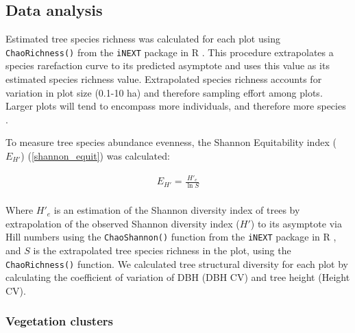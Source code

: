 \documentclass[11pt,a4paper]{article}
\newcommand{\todo}[1]{\textcolor{red}{\textbf{#1}}}   %
\begin{document}
% 
% 

\subsection*{Data analysis}
Estimated tree species richness was calculated for each plot using \verb|ChaoRichness()| from the \verb|iNEXT| package in R \citep{Hsieh2016}. This procedure extrapolates a species rarefaction curve to its predicted asymptote and uses this value as its estimated species richness value. Extrapolated species richness accounts for variation in plot size (0.1-10 ha) and therefore sampling effort among plots. Larger plots will tend to encompass more individuals, and therefore more species \citep{Dengler2009}.

To measure tree species abundance evenness, the Shannon Equitability index ($E_{H'}$) \citep{Smith1996} (\autoref{shannon_equit}) was calculated: 

\begin{equation}
	\begin{gathered}
		E_{H'} = \frac{H'_{e}}{\ln{S}} \\
	\end{gathered}
	\label{shannon_equit}
\end{equation}

Where $H'_{e}$ is an estimation of the Shannon diversity index of trees by extrapolation of the observed Shannon diversity index ($H'$) to its asymptote via Hill numbers using the \verb|ChaoShannon()| function from the \verb|iNEXT| package in R \citep{Hsieh2016}, and $S$ is the extrapolated tree species richness in the plot, using the \verb|ChaoRichness()| function. We calculated tree structural diversity for each plot by calculating the coefficient of variation of DBH (DBH CV) and tree height (Height CV). 

\subsubsection*{Vegetation clusters}
\end{document}
